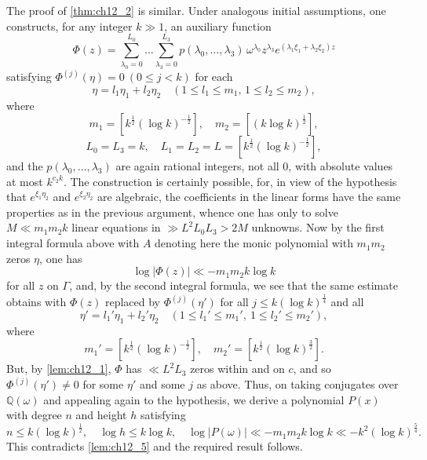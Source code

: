 The proof of \autoref{thm:ch12_2} is similar. Under analogous initial assumptions, one constructs, for any integer $k \gg 1$, an auxiliary function
\[\Phi(z) = \sum_{\lambda_0=0}^{L_0} \dots \sum_{\lambda_3=0}^{L_3} p(\lambda_0, \dots, \lambda_3) \, \omega^{\lambda_0} z^{\lambda_3} e^{(\lambda_1 \xi_1 + \lambda_2 \xi_2) z}\]
satisfying $\Phi^{(j)}(\eta) = 0 \ (0 \le j < k)$ for each
\[\eta = l_1 \eta_1 + l_2 \eta_2 \quad (1 \leqslant l_1 \leqslant m_1, \, 1 \leqslant l_2 \leqslant m_2),\]
where
\[m_1 = [k^{\frac{1}{2}}(\log k)^{-\frac{1}{2}}], \quad m_2 = [(k \log k)^{\frac{1}{2}}],\]
\[L_0 = L_3 = k, \quad L_1 = L_2 = L = [k^{\frac{1}{2}}(\log k)^{-\frac{1}{2}}],\]
and the $p(\lambda_0, \dots, \lambda_3)$ are again rational integers, not all 0, with absolute values at most $k^{c_2 k}$. The construction is certainly possible, for, in view of the hypothesis that $e^{\xi_1\eta_2}$ and $e^{\xi_2\eta_2}$ are algebraic, the coefficients in the linear forms have the same properties as in the previous argument, whence one has only to solve $M \ll m_1 m_2 k$ linear equations in $\gg L^2 L_0 L_3 > 2M$ unknowns. Now by the first integral formula above with $A$ denoting here the monic polynomial with $m_1 m_2$ zeros $\eta$, one has
\[\log |\Phi(z)| \ll -m_1 m_2 k \log k\]
for all $z$ on $\Gamma$, and, by the second integral formula, we see that the same estimate obtains with $\Phi(z)$ replaced by $\Phi^{(j)}(\eta')$ for all $j \le k(\log k)^{\frac{1}{4}}$ and all
\[\eta' = l_1' \eta_1 + l_2' \eta_2 \quad (1 \leqslant l_1' \leqslant m_1', \ 1 \leqslant l_2' \leqslant m_2'),\]
where
\[m_1' = [k^{\frac{1}{2}}(\log k)^{-\frac{1}{2}}], \quad m_2' = [k^{\frac{1}{2}}(\log k)^{\frac{3}{2}}].\]
But, by \autoref{lem:ch12_1}, $\Phi$ has $\ll L^2 L_3$ zeros within and on $c$, and so $\Phi^{(j)}(\eta') \neq 0$ for some $\eta'$ and some $j$ as above. Thus, on taking conjugates over $\mathbb{Q}(\omega)$ and appealing again to the hypothesis, we derive a polynomial $P(x)$ with degree $n$ and height $h$ satisfying
\[n \leqslant k(\log k)^{\frac{1}{2}}, \quad \log h \leqslant k \log k, \quad \log |P(\omega)| \ll -m_1 m_2 k \log k \ll -k^2 (\log k)^{\frac{5}{4}}.\]
This contradicts \autoref{lem:ch12_5} and the required result follows.

